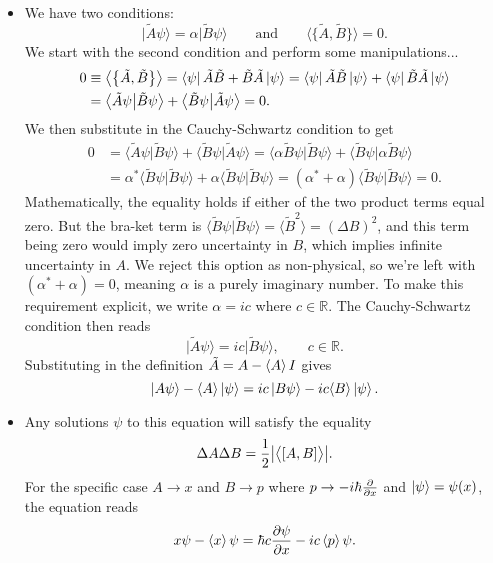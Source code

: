 \documentclass[11pt, a4paper]{article}
\newcommand{\eqtext}[1]{\qquad \text{#1} \qquad}
\newcommand{\evb}[1]{\big \langle {#1} \big \rangle}  %
\newcommand{\bket}[1]{\big | {#1} \big \rangle}  %
\newcommand{\bbraket}[2]{\big \langle {#1} \big | {#2} \big \rangle}  %
\begin{document}
\begin{itemize}
	\item We have two conditions:
	\begin{equation*}
		\bket{\tilde{A}\psi} = \alpha \bket{\tilde{B}\psi} \eqtext{and} \big\langle \big\{\tilde{A}, \tilde{B}\big\} \big\rangle = 0.
	\end{equation*}
	We start with the second condition and perform some manipulations... 
	\begin{align*}
		0 &\equiv \evb{\big\{\tilde{A}, \tilde{B}\big\}} = \bra{\psi}\tilde{A}\tilde{B} + \tilde{B} \tilde{A} \ket{\psi} = \bra{\psi}\tilde{A}\tilde{B} \ket{\psi} + \bra{\psi}\tilde{B} \tilde{A} \ket{\psi}\\
		&= \bbraket{\tilde{A}\psi}{\tilde{B}\psi} + \bbraket{\tilde{B}\psi}{\tilde{A}\psi} = 0.
	\end{align*}
	We then substitute in the Cauchy-Schwartz condition to get
	\begin{align*}
		0 &= \bbraket{\tilde{A}\psi}{\tilde{B}\psi} + \bbraket{\tilde{B}\psi}{\tilde{A}\psi} = \bbraket{\alpha \tilde{B}\psi}{\tilde{B}\psi} + \bbraket{\tilde{B}\psi}{\alpha \tilde{B}\psi} \\
		& = \alpha^{*}\bbraket{ \tilde{B}\psi}{\tilde{B}\psi} + \alpha\bbraket{\tilde{B}\psi}{\tilde{B}\psi} = (\alpha^{*} + \alpha)\bbraket{\tilde{B}\psi}{\tilde{B}\psi} = 0.
	\end{align*}
	Mathematically, the equality holds if either of the two product terms equal zero. But the bra-ket term is $ \bbraket{\tilde{B}\psi}{\tilde{B}\psi} = \big \langle \tilde{B}^{2} \big \rangle = (\Delta B)^{2}$, and this term being zero would imply zero uncertainty in $ B $, which implies infinite uncertainty in $ A $. We reject this option as non-physical, so we're left with $ (\alpha^{*} + \alpha) = 0 $, meaning $ \alpha $ is a purely imaginary number. To make this requirement explicit, we write $ \alpha = i c $ where $ c \in \mathbb{R} $. The Cauchy-Schwartz condition then reads 
	\begin{equation*}
		\bket{\tilde{A}\psi} = i c \bket{\tilde{B}\psi}, \qquad c \in \mathbb{R}.
	\end{equation*}
	Substituting in the definition $ \tilde{A} = A - \expval{A}I $ gives
	\begin{equation*}
		\ket{A\psi} - \langle A \rangle\ket{\psi} = ic\ket{B\psi} - ic\langle B \rangle\ket{\psi}.
	\end{equation*}
	
	\item Any solutions $ \psi $ to this equation will satisfy the equality
	\begin{equation*}
		  \Delta A \Delta B = \frac{1}{2}\abs{\big\langle [A, B] \big\rangle}.
	\end{equation*}
	For the specific case $ A \to x $ and $ B \to p $ where $ p \to  - i \hbar \pdv{}{x} $ and $ \ket{\psi} = \psi(x) $, the equation reads
	\begin{equation*}
		x \psi - \expval{x} \psi = \hbar c \pdv{\psi}{x} - ic \expval{p} \psi.
	\end{equation*}
\end{itemize}
\end{document}
